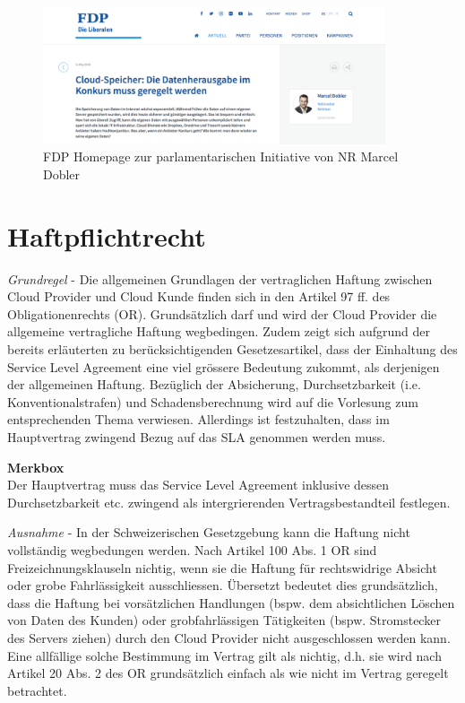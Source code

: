 \documentclass[a4paper,pointlessnumbers]{scrreprt}
\newcommand{\merkbox}[2][0.8\textwidth]{ \begin{center} \begin{tcolorbox}[enhanced, drop fuzzy midday shadow, width={#1}, opacityframe=0.5, colframe=BrickRed, colback=white] {\ECFTeenSpirit \color{BrickRed}\textbf{Merkbox} \qquad {\tiny das gilt es zu beachten}} \\  #2 \end{tcolorbox} \end{center}}
\begin{document}
\begin{figure}[H]
\begin{center}
\includegraphics[width=0.9\textwidth]{images/fdpralinit.pdf}
\caption{FDP Homepage zur parlamentarischen Initiative von NR Marcel Dobler}
\end{center}
\end{figure}

\pagebreak

\section{Haftpflichtrecht}
\textit{Grundregel} - Die allgemeinen Grundlagen der vertraglichen Haftung zwischen Cloud Provider und Cloud Kunde finden sich in den Artikel 97 ff. des Obligationenrechts (OR). Grundsätzlich darf und wird der Cloud Provider die allgemeine vertragliche Haftung wegbedingen. Zudem zeigt sich aufgrund der bereits erläuterten zu berücksichtigenden Gesetzesartikel, dass der Einhaltung des Service Level Agreement eine viel grössere Bedeutung zukommt, als derjenigen der allgemeinen Haftung. Bezüglich der Absicherung, Durchsetzbarkeit (i.e. Konventionalstrafen) und Schadensberechnung wird auf die Vorlesung zum entsprechenden Thema verwiesen. Allerdings ist festzuhalten, dass im Hauptvertrag zwingend Bezug auf das SLA genommen werden muss.

\merkbox[0.7\textwidth]{Der Hauptvertrag muss das Service Level Agreement inklusive dessen Durchsetzbarkeit etc. zwingend als intergrierenden Vertragsbestandteil festlegen.}

\textit{Ausnahme} - In der Schweizerischen Gesetzgebung kann die Haftung nicht vollständig wegbedungen werden. Nach Artikel 100 Abs. 1 OR sind Freizeichnungsklauseln nichtig, wenn sie die Haftung für rechtswidrige Absicht oder grobe Fahrlässigkeit ausschliessen. Übersetzt bedeutet dies grundsätzlich, dass die Haftung bei vorsätzlichen Handlungen (bspw. dem absichtlichen Löschen von Daten des Kunden) oder grobfahrlässigen Tätigkeiten (bspw. Stromstecker des Servers ziehen) durch den Cloud Provider nicht ausgeschlossen werden kann. Eine allfällige solche Bestimmung im Vertrag gilt als nichtig, d.h. sie wird nach Artikel 20 Abs. 2 des OR grundsätzlich einfach als \glqq wie nicht im Vertrag geregelt\grqq{} betrachtet.
\end{document}
